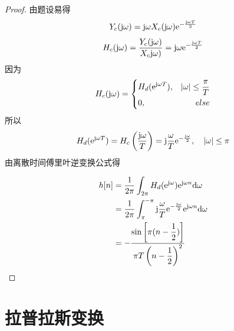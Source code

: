 \begin{proof}

    由题设易得
    $$Y_c(\mathrm{j} \omega) = \mathrm{j} \omega X_c(\mathrm{j} \omega) \mathrm{e}^{-\frac{\mathrm{j} \omega T}{2}}$$
    $$H_c(\mathrm{j} \omega) = \dfrac{Y_c(\mathrm{j} \omega)}{X_c\mathrm{j} \omega)} = \mathrm{j} \omega \mathrm{e}^{-\frac{\mathrm{j} \omega T}{2}}$$
    因为
    $$H_c(\mathrm{j} \omega) = \left\{
        \begin{aligned}
            & H_d(\mathrm{e}^{\mathrm{j} \omega T}), & |\omega| \leq \dfrac{\pi}{T} \\
            & 0, & else 
        \end{aligned}
        \right.
    $$
    所以
    $$H_d(\mathrm{e}^{\mathrm{j} \omega T}) = H_c \left( \dfrac{\mathrm{j} \omega}{T} \right) = \mathrm{j} \dfrac{\omega}{T} \mathrm{e}^{-\frac{\mathrm{j} \omega}{2}}, \quad |\omega| \leq \pi$$
    由离散时间傅里叶逆变换公式得
    
    \begin{align*}
        h[n] & = \dfrac{1}{2\pi} \int_{2\pi}{H_d(\mathrm{e}^{\mathrm{j} \omega})\mathrm{e}^{\mathrm{j} \omega n}}\mathrm{d} \omega \\
        & = \dfrac{1}{2\pi} \int_{\pi}^{-\pi}{\mathrm{j} \dfrac{\omega}{T} \mathrm{e}^{-\frac{\mathrm{j} \omega}{2}} \mathrm{e}^{\mathrm{j} \omega n}}\mathrm{d} \omega \\
        & = - \dfrac{\sin{\left[ \pi (n - \dfrac{1}{2}) \right]}}{\pi T \left( n - \dfrac{1}{2} \right)^2}
    \end{align*}

\end{proof}

\section{拉普拉斯变换}

